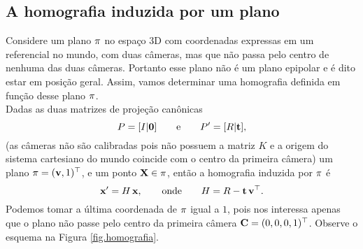 \subsection{A homografia induzida por um plano}\label{sec.homografia}

Considere um plano $\pi$ no espaço 3D com coordenadas expressas em um referencial no mundo, com duas câmeras, mas que não passa pelo centro de nenhuma das duas câmeras. Portanto esse plano não é um plano epipolar e é dito estar em posição geral. Assim, vamos determinar uma homografia definida em função desse plano $\pi$.\\

Dadas as duas matrizes de projeção canônicas
\begin{equation*}
P=[I|{\bf 0}]\qquad\text{e}\qquad P'=[R|{\bf t}],
\end{equation*}
(as câmeras não são calibradas pois não possuem a matriz $K$ e a origem do sistema cartesiano do mundo coincide com o centro da primeira câmera) um plano $\pi=({\bf v},1)^\top$, e um ponto $\mathbf{X}\in\pi$, então a homografia induzida por $\pi$ é
\begin{equation*}
\mathbf{x}'=H\,\mathbf{x},\qquad\text{onde}\qquad H=R-{\bf t}\,{\bf v}^\top.
\end{equation*}
Podemos tomar a última coordenada de $\pi$ igual a $1$, pois nos interessa apenas que o plano não passe pelo centro da primeira câmera ${\bf C}=(0,0,0,1)^\top$. Observe o esquema na Figura \ref{fig.homografia}.

